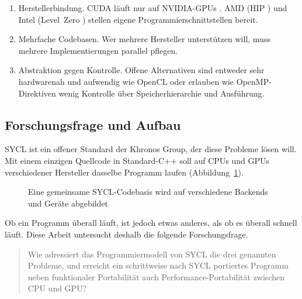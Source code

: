 \documentclass[12pt,a4paper]{article}
\begin{document}
\begin{enumerate}[nosep]
    \item Herstellerbindung. CUDA läuft nur auf NVIDIA-GPUs
    \cite{nickolls2008cuda}. AMD (HIP \cite{amd_hip}) und Intel (Level~Zero
    \cite{intel_level_zero}) stellen eigene Programmierschnittstellen bereit.
    \item Mehrfache Codebasen. Wer mehrere Hersteller unterstützen
    will, muss mehrere Implementierungen parallel pflegen.
    \item Abstraktion gegen Kontrolle. Offene Alternativen sind
    entweder sehr hardwarenah und aufwendig wie OpenCL
    \cite{stone2010opencl} oder erlauben wie OpenMP-Direktiven \cite{openmp_spec}
    wenig Kontrolle über Speicherhierarchie und Ausführung.
\end{enumerate}

\subsection{Forschungsfrage und Aufbau}\label{sec:frage}

SYCL ist ein offener Standard der Khronos Group, der diese Probleme lösen
will. Mit einem einzigen Quellcode in Standard-C++ soll auf CPUs und GPUs
verschiedener Hersteller dasselbe Programm laufen \cite{khronos2020sycl}
(Abbildung~\ref{fig:codebasen}).

\begin{figure}[htbp]
\centering
{}
\caption[SYCL-Codebasis für mehrere Backends]{Eine gemeinsame SYCL-Codebasis wird auf verschiedene Backends und Geräte abgebildet}
\label{fig:codebasen}
\end{figure}

Ob ein Programm überall läuft, ist jedoch etwas anderes, als ob es überall
schnell läuft. Diese Arbeit untersucht deshalb die folgende Forschungsfrage.

\begin{quote}
Wie adressiert das Programmiermodell von SYCL die drei genannten
Probleme, und erreicht ein schrittweise nach SYCL portiertes Programm neben
funktionaler Portabilität auch Performance-Portabilität zwischen CPU und
GPU?
\end{quote}
\end{document}
